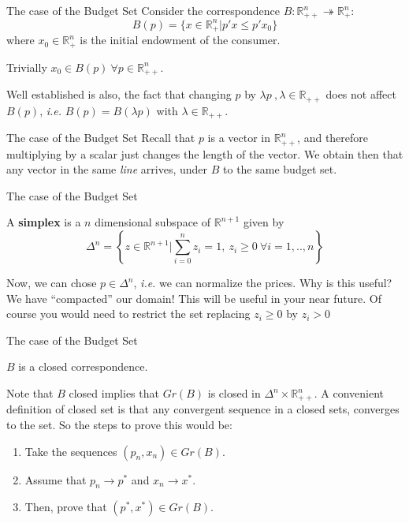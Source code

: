\documentclass[aspectratio=169, handout]{beamer}
\begin{document}
\begin{frame}{The case of the Budget Set}
    Consider the correspondence $B: \mathds{R}^n_{++}\twoheadrightarrow\mathds{R}^n_+$:
    \[B(p) = \{x\in\mathds{R}^n_+ | p'x\leq p'x_0\}\]
    where $x_0\in \mathds{R}^n_{+}$ is the initial endowment of the consumer.
    
    \pause

    Trivially $x_0\in B(p)\ \forall p\in\mathds{R}^n_{++}$.

    \pause

    Well established is also, the fact that changing $p$ by $\lambda p\ , \lambda\in\mathds{R}_{++}$ does not affect $B(p)$, \textit{i.e.} $B(p)=B(\lambda p)$ with $\lambda\in\mathds{R}_{++}$.
\end{frame}

\begin{frame}{The case of the Budget Set}
    Recall that $p$ is a vector in $\mathds{R}^n_{++}$, and therefore multiplying by a scalar just changes the length of the vector. We obtain then that any vector in the same \textit{line} arrives, under $B$ to the same budget set.
\end{frame}

\begin{frame}{The case of the Budget Set}
    \begin{definition}
        A \textbf{simplex} is a $n$ dimensional subspace of $\mathds{R}^{n+1}$ given by \[\Delta^n=\left\{z\in\mathbb{R}^{n+1}|\sum_{i=0}^n z_i = 1,\ z_i\geq 0\ \forall i=1,..,n\right\}\]
    \end{definition}

    Now, we can chose $p\in\Delta^n$, \textit{i.e.} we can normalize the prices. Why is this useful? \pause We have ``compacted'' our domain! This will be useful in your near future. Of course you would need to restrict the set replacing $z_i\geq 0$ by $z_i>0$
\end{frame}

\begin{frame}{The case of the Budget Set}
    \begin{theorem}
        $B$ is a closed correspondence.
    \end{theorem}
    
    Note that $B$ closed implies that $Gr(B)$ is closed in $\Delta^n\times \mathds{R}_{++}^n$. A convenient definition of closed set is that any convergent sequence in a closed sets, converges to the set. So the steps to prove this would be:
    \begin{enumerate}
        \item Take the sequences $(p_n,x_n)\in Gr(B)$.
        \item Assume that $p_n\rightarrow p^*$ and $x_n\rightarrow x^*$.
        \item Then, prove that $(p^*, x^*)\in Gr(B)$.
    \end{enumerate}
    
\end{frame}
\end{document}

